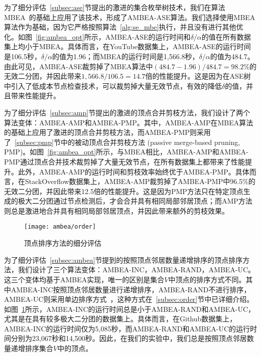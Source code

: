 

为了细分评估~\ref{subsec:ase}节提出的激进的集合枚举树技术，我们在算法MBEA~\cite{iMBEA14}的基础上应用了该技术，形成了AMBEA-ASE算法。我们选择使用MBEA算法作为基础，因为它严格按照算法~\ref{alg:se_mbe}执行，并且没有进行其他优化。如图~\ref{fig:ambea_opt}所示，AMBEA-ASE的运行时间和$\delta/\alpha$的值在所有数据集上均小于MBEA。具体而言，在YouTube数据集上，AMBEA-ASE的运行时间是106.5秒，$\delta/\alpha$的值为1.96；而MBEA的运行时间是1,566.8秒，$\delta/\alpha$的值为484.7。由此可见，AMBEA-ASE裁剪掉了MBEA算法中$(484.7-1.96)/484.7=98.2\%$的无效二分团，并因此带来$1,566.8/106.5=14.7$倍的性能提升。这是因为在ASE树中引入了低成本节点检查技术，可以裁剪掉大量无效节点，有效的降低$\delta$的值，并且带来性能提升。

为了细分评估~\ref{subsec:amp}节提出的激进的顶点合并剪枝方法，我们设计了两个算法变体：AMBEA-AMP和AMBEA-PMP。其中，AMBEA-AMP在MBEA算法的基础上应用了激进的顶点合并剪枝方法，而AMBEA-PMP则采用了~\ref{subsec:pmp}节中的被动顶点合并剪枝方法 (passive merge-based pruning, PMP)。如图~\ref{fig:ambea_opt}所示，与MBEA相比，AMBEA-AMP和AMBEA-PMP通过顶点合并技术裁剪掉了大量无效节点，在所有数据集上都带来了性能提升。此外，AMBEA-AMP的运行时间和剪枝效率始终优于AMBEA-PMP。具体而言，在StackOverflow数据集上，AMBEA-AMP裁剪掉了AMBEA-PMP中96.5\%的无效二分团，并因此带来12.5倍的性能提升。这是因为PMP方法只在特定顶点生成的极大二分团通过节点检测后，才会合并具有相同局部邻居顶点；而AMP方法则总是激进地合并具有相同局部邻居顶点，并因此带来额外的剪枝效果。

\begin{figure} [H]
	\centering

		\texttt{[image: ambea/order]}

	\caption{顶点排序方法的细分评估}
	\label{fig:ambea_opt_order}
\end{figure}

为了细分评估~\ref{subsec:ambea}节提到的按照顶点邻居数量递增排序的顶点排序方法，我们设计了三个算法变体：AMBEA-INC，AMBEA-RAND，AMBEA-UC。这三个变体均基于AMBEA实现，唯一的区别是集合$V$中顶点的排序方式不同。其中AMBEA-INC按照顶点邻居数量进行递增排序，AMBEA-RAND不进行排序，AMBEA-UC则采用单边排序方式~\cite{ooMBE22}，这种方式在~\ref{subsec:order}节中已详细介绍。如图~\ref{fig:ambea_opt_order}所示，AMBEA-INC的运行时间总是小于AMBEA-RAND和AMBEA-UC，尤其是在具有较多极大二分团的数据集上。具体而言，在Github数据集上，AMBEA-INC的运行时间仅为5,085秒，而AMBEA-RAND和AMBEA-UC的运行时间分别为23,067秒和14,500秒。因此，在我们的实验中，我们总是按照顶点邻居数量递增排序集合$V$中的顶点。

